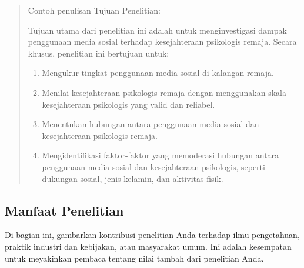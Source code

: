 \documentclass[
  indonesian,
  letterpaper,
]{scrbook}
\providecommand{\tightlist}{%
  \setlength{\itemsep}{0pt}\setlength{\parskip}{0pt}}
\begin{document}
\begin{quote}
Contoh penulisan Tujuan Penelitian:

Tujuan utama dari penelitian ini adalah untuk menginvestigasi dampak
penggunaan media sosial terhadap kesejahteraan psikologis remaja. Secara
khusus, penelitian ini bertujuan untuk:

\begin{enumerate}
\def\labelenumi{\arabic{enumi}.}
\tightlist
\item
  Mengukur tingkat penggunaan media sosial di kalangan remaja.
\item
  Menilai kesejahteraan psikologis remaja dengan menggunakan skala
  kesejahteraan psikologis yang valid dan reliabel.
\item
  Menentukan hubungan antara penggunaan media sosial dan kesejahteraan
  psikologis remaja.
\item
  Mengidentifikasi faktor-faktor yang memoderasi hubungan antara
  penggunaan media sosial dan kesejahteraan psikologis, seperti dukungan
  sosial, jenis kelamin, dan aktivitas fisik.
\end{enumerate}
\end{quote}

\subsection{Manfaat Penelitian}\label{manfaat-penelitian}

Di bagian ini, gambarkan kontribusi penelitian Anda terhadap ilmu
pengetahuan, praktik industri dan kebijakan, atau masyarakat umum. Ini
adalah kesempatan untuk meyakinkan pembaca tentang nilai tambah dari
penelitian Anda.
\end{document}
